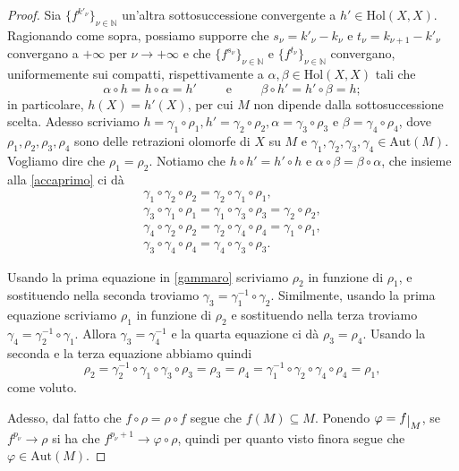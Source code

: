 \begin{proof}
    Sia $\{f^{k'_\nu}\}_{\nu\in\mathbb{N}}$ un'altra sottosuccessione convergente a $h'\in\text{Hol}(X,X)$. Ragionando come sopra, possiamo supporre che $s_\nu=k'_\nu-k_\nu$ e $t_\nu=k_{\nu+1}-k'_\nu$ convergano a $+\infty$ per $\nu\longrightarrow+\infty$ e che $\{f^{s_\nu}\}_{\nu\in\mathbb{N}}$ e $\{f^{t_\nu}\}_{\nu\in\mathbb{N}}$ convergano, uniformemente sui compatti, rispettivamente a $\alpha,\beta \in \text{Hol}(X,X)$ tali che
    \begin{equation}\label{accaprimo}
        \alpha\circ h=h\circ\alpha=h' \qquad\text{ e }\qquad \beta\circ h'=h'\circ\beta=h;
    \end{equation}
    in particolare, $h(X)=h'(X)$, per cui $M$ non dipende dalla sottosuccessione scelta. Adesso scriviamo $h=\gamma_1\circ\rho_1,h'=\gamma_2\circ\rho_2,\alpha=\gamma_3\circ\rho_3$ e $\beta=\gamma_4\circ\rho_4$, dove $\rho_1,\rho_2,\rho_3,\rho_4$ sono delle retrazioni olomorfe di $X$ su $M$ e $\gamma_1,\gamma_2,\gamma_3,\gamma_4\in\text{Aut}(M)$. Vogliamo dire che $\rho_1=\rho_2$. Notiamo che $h\circ h'=h'\circ h$ e $\alpha\circ\beta=\beta\circ\alpha$, che insieme alla \eqref{accaprimo} ci dà
    \begin{equation}\label{gammaro}\begin{split}
        \gamma_1\circ\gamma_2\circ\rho_2=\gamma_2\circ\gamma_1\circ\rho_1,\\
        \gamma_3\circ\gamma_1\circ\rho_1=\gamma_1\circ\gamma_3\circ\rho_3=\gamma_2\circ\rho_2,\\
        \gamma_4\circ\gamma_2\circ\rho_2=\gamma_2\circ\gamma_4\circ\rho_4=\gamma_1\circ\rho_1,\\
        \gamma_3\circ\gamma_4\circ\rho_4=\gamma_4\circ\gamma_3\circ\rho_3.
    \end{split}\end{equation}

    Usando la prima equazione in \eqref{gammaro} scriviamo $\rho_2$ in funzione di $\rho_1$, e sostituendo nella seconda troviamo $\gamma_3=\gamma_1^{-1}\circ\gamma_2$. Similmente, usando la prima equazione scriviamo $\rho_1$ in funzione di $\rho_2$ e sostituendo nella terza troviamo $\gamma_4=\gamma_2^{-1}\circ\gamma_1$. Allora $\gamma_3=\gamma_4^{-1}$ e la quarta equazione ci dà $\rho_3=\rho_4$. Usando la seconda e la terza equazione abbiamo quindi
    $$\rho_2=\gamma_2^{-1}\circ\gamma_1\circ\gamma_3\circ\rho_3=\rho_3=\rho_4=\gamma_1^{-1}\circ\gamma_2\circ\gamma_4\circ\rho_4=\rho_1,$$
    come voluto.

    Adesso, dal fatto che $f\circ\rho=\rho\circ f$ segue che $f(M)\subseteq M$. Ponendo $\varphi=f\restrict{M}$, se $f^{p_\nu}\longrightarrow\rho$ si ha che $f^{p_\nu+1}\longrightarrow\varphi\circ\rho$, quindi per quanto visto finora segue che $\varphi\in\text{Aut}(M)$.


\end{proof}

